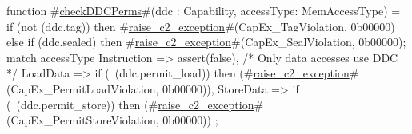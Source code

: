 function #\hyperref[sailMIPSzcheckDDCPerms]{checkDDCPerms}#(ddc : Capability, accessType: MemAccessType) =
  {
    if (not (ddc.tag)) then
      #\hyperref[sailMIPSzraisezyc2zyexception]{raise\_c2\_exception}#(CapEx_TagViolation, 0b00000)
    else if (ddc.sealed) then
      #\hyperref[sailMIPSzraisezyc2zyexception]{raise\_c2\_exception}#(CapEx_SealViolation, 0b00000);
    match accessType {
      Instruction  => assert(false), /* Only data accesses use DDC */
      LoadData     => if (~(ddc.permit_load)) then (#\hyperref[sailMIPSzraisezyc2zyexception]{raise\_c2\_exception}#(CapEx_PermitLoadViolation, 0b00000)),
      StoreData    => if (~(ddc.permit_store)) then (#\hyperref[sailMIPSzraisezyc2zyexception]{raise\_c2\_exception}#(CapEx_PermitStoreViolation, 0b00000))
    };
  }
